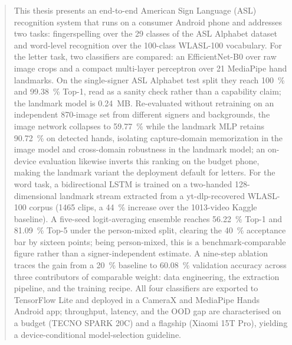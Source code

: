 \begin{abstract}
This thesis presents an end-to-end American Sign Language (ASL)
recognition system that runs on a consumer Android phone and
addresses two tasks: fingerspelling over the 29 classes of the ASL
Alphabet dataset and word-level recognition over the 100-class
WLASL-100 vocabulary. For the letter task, two classifiers are
compared: an EfficientNet-B0 over raw image crops and a compact
multi-layer perceptron over 21 MediaPipe hand landmarks. On the
single-signer ASL Alphabet test split they reach \SI{100}{\percent}
and \SI{99.38}{\percent} Top-1, read as a sanity check rather than a
capability claim; the landmark model is \SI{0.24}{MB}. Re-evaluated
without retraining on an independent \num{870}-image set from
different signers and backgrounds, the image network collapses to
\SI{59.77}{\percent} while the landmark MLP retains
\SI{90.72}{\percent} on detected hands, isolating capture-domain
memorization in the image model and cross-domain robustness in the
landmark model; an on-device evaluation likewise inverts this ranking
on the budget phone, making the landmark variant the deployment
default for letters. For the word task, a bidirectional LSTM is
trained on a two-handed 128-dimensional landmark stream extracted from
a yt-dlp-recovered WLASL-100 corpus (\num{1465} clips, a
\SI{44}{\percent} increase over the \num{1013}-video Kaggle baseline).
A five-seed logit-averaging ensemble reaches \SI{56.22}{\percent}
Top-1 and \SI{81.09}{\percent} Top-5 under the person-mixed split,
clearing the \SI{40}{\percent} acceptance bar by sixteen points; being
person-mixed, this is a benchmark-comparable figure rather than a
signer-independent estimate. A nine-step ablation traces the gain from
a \SI{20}{\percent} baseline to \SI{60.08}{\percent} validation
accuracy across three contributors of comparable weight: data
engineering, the extraction pipeline, and the training recipe. All
four classifiers are exported to TensorFlow Lite and deployed in a
CameraX and MediaPipe Hands Android app; throughput, latency, and the
OOD gap are characterised on a budget (TECNO SPARK 20C) and a flagship
(Xiaomi 15T Pro), yielding a device-conditional model-selection
guideline.
\end{abstract}
